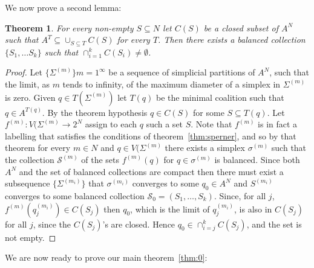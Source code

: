\documentclass[11pt]{article} \usepackage{amssymb}
\newtheorem{theorem}{Theorem}[section]
\begin{document}
We now prove a second lemma:
\begin{theorem}
  \label{thm:KKMS}
  For every non-empty $S \subseteq N$ let $C(S)$ be a closed subset of
  $A^N$ such that $A^T \subseteq \cup_{S \subseteq T}C(S)$ for every $T$.
  Then there exists a balanced collection $\{S_1, \ldots S_k\}$ such
  that $\cap_{i=1}^kC(S_i) \neq \emptyset$.
\end{theorem}
\begin{proof}
  Let $\{\Sigma^{(m)}\}{m=1}^\infty$ be a sequence of simplicial
  partitions of $A^N$, such that the limit, as $m$ tends to infinity,
  of the maximum diameter of a simplex in $\Sigma^{(m)}$ is
  zero. Given $q \in T(\Sigma^{(m)})$ let $T(q)$ be the minimal
  coalition such that $q \in A^{T(q)}$. By the theorem hypothesis $q
  \in C(S)$ for some $S \subseteq T(q)$. Let $f^{(m)}:V(\Sigma^{(m)}
  \to 2^N$ assign to each $q$ such a set $S$. Note that $f^{(m)}$ is
  in fact a labelling that satisfies the conditions of
  theorem~\ref{thm:sperner}, and so by that theorem for every $m \in
  N$ and $q \in V(\Sigma^{(m)}$ there exists a simplex $\sigma^{(m)}$
  such that the collection $\mathcal{S}^{(m)}$ of the sets
  $f^{(m)}(q)$ for $q \in \sigma^{(m)}$ is balanced. Since both $A^N$
  and the set of balanced collections are compact then there must
  exist a subsequence $\{\Sigma^{(m_i)}\}$ that $\sigma^{(m_i)}$
  converges to some $q_0 \in A^N$ and $S^{(m_i)}$ converges to some
  balanced collection $\mathcal{S}_0=(S_1,\ldots,S_k)$. Since, for all
  $j$, $f^{(m)}(q_j^{(m_i)}) \in C(S_j)$ then $q_0$, which is the
  limit of $q_j^{(m_i)}$, is also in $C(S_j)$ for all $j$, since the
  $C(S_j)$'s are closed. Hence $q_0 \in \cap_{i=j}^kC(S_j)$, and the
  set is not empty.
\end{proof}

We are now ready to prove our main theorem~\ref{thm:0}:
\end{document}
